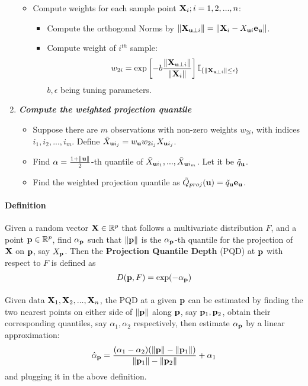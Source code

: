 \documentclass{article}
\begin{document}
\begin{enumerate}
\begin{itemize}
\item Compute weights for each sample point ${\mathbf{X}}_i; i=1,2,...,n$:

\begin{itemize}
\item Compute the orthogonal Norms by $\|{\mathbf{X}}_{{\bf{u}}\perp i}\|=\|{\mathbf{X}}_i-X_{{\bf{u}} i}{\bf{e}}_{\bf{u}}\|$.

\item Compute weight of $i^{th}$ sample:
$$w_{2i} = \exp\left[-b\frac{\|{\mathbf{X}}_{{\bf{u}}\perp i}\|}{\|{\mathbf{X}}_i\|}\right]\mathbb{I}_{\{\|{\mathbf{X}}_{{\bf{u}}\perp i}\|\leq\epsilon\}}$$
$b,\epsilon$ being tuning parameters.
\end{itemize}
\end{itemize} 

\item \textit{\textbf{Compute the weighted projection quantile}}
\begin{itemize}
\item Suppose there are $m$ observations with non-zero weights $w_{2i}$, with indices $i_1,i_2,...,i_m$. Define $\tilde X_{{\bf{u}} i_j} = w_{\bf{u}} w_{2i_j}X_{{\bf{u}} i_j}$.
\item Find $\alpha=\frac{1+\|{\bf{u}}\|}{2}$-th quantile of $\tilde X_{{\bf{u}} i_1},...,\tilde X_{{\bf{u}} i_m}$. Let it be $\tilde q_{\bf{u}}$.
\item Find the weighted projection quantile as $\tilde Q_{proj}({\bf{u}})=\tilde q_{\bf{u}}{\bf{e}}_{\bf{u}}$.
\end{itemize}
\end{enumerate}
\newpage

\paragraph{Definition} Given a random vector ${\mathbf{X}}\in \mathbb{R}^p$ that follows a multivariate distribution $F$, and a point ${\bf{p}}\in\mathbb{R}^p$, find $\alpha_{\bf{p}}$ such that $\|{\bf{p}}\|$ is the $\alpha_{\bf{p}}$-th quantile for the projection of ${\mathbf{X}}$ on ${\bf{p}}$, say $X_{\bf{p}}$. Then the \textbf{Projection Quantile Depth} (PQD) at ${\bf{p}}$ with respect to $F$ is defined as
$$ D({\bf{p}}, F) = \exp(-\alpha_{\bf{p}}) $$

\paragraph{} Given data ${\mathbf{X}}_1,{\mathbf{X}}_2,...,{\mathbf{X}}_n$, the PQD at a given ${\bf{p}}$ can be estimated by finding the two nearest points on either side of $\|{\bf{p}}\|$ along ${\bf{p}}$, say ${\bf{p}}_1, {\bf{p}}_2$, obtain their corresponding quantiles, say $\alpha_1, \alpha_2$ respectively, then estimate $\alpha_{\bf{p}}$ by a linear approximation:
$$\hat\alpha_{\bf{p}}=\frac{(\alpha_1-\alpha_2)(\|{\bf{p}}\|-\|{\bf{p}}_1\|)}{\|{\bf{p}}_1\|-\|{\bf{p}}_2\|}+\alpha_1$$
and plugging it in the above definition.
\end{document}

